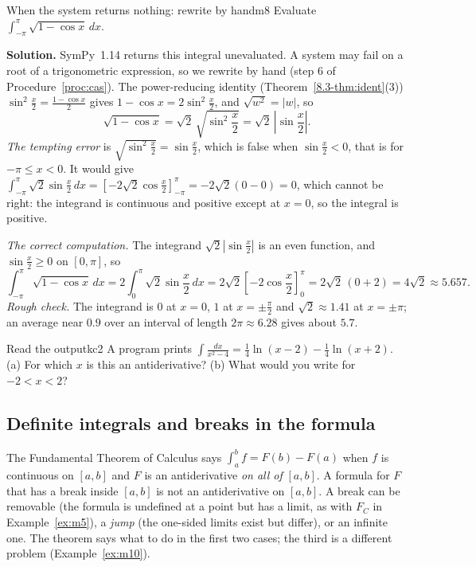 \documentclass[11pt]{article}
\begin{document}
\begin{exmp}{When the system returns nothing: rewrite by hand}{m8}
Evaluate $\displaystyle\int_{-\pi}^{\pi}\sqrt{1-\cos x}\,dx$.

\textbf{Solution.} SymPy~1.14 returns this integral unevaluated. A system may fail on a root of a trigonometric expression, so we rewrite by hand (step 6 of Procedure~\ref{proc:cas}). The power-reducing identity (Theorem~\ref{8.3-thm:ident}(3)) $\sin^2\frac x2=\frac{1-\cos x}2$ gives $1-\cos x=2\sin^2\frac x2$, and $\sqrt{w^2}=\lvert w\rvert$, so
\[\sqrt{1-\cos x}=\sqrt2\,\sqrt{\sin^2\frac x2}=\sqrt2\,\left\lvert\sin\frac x2\right\rvert .\]
\emph{The tempting error} is $\sqrt{\sin^2\frac x2}=\sin\frac x2$, which is false when $\sin\frac x2<0$, that is for $-\pi\le x<0$. It would give $\int_{-\pi}^{\pi}\sqrt2\sin\frac x2\,dx=\left[-2\sqrt2\cos\frac x2\right]_{-\pi}^{\pi}=-2\sqrt2(0-0)=0$, which cannot be right: the integrand is continuous and positive except at $x=0$, so the integral is positive.

\emph{The correct computation.} The integrand $\sqrt2\left\lvert\sin\frac x2\right\rvert$ is an even function, and $\sin\frac x2\ge0$ on $[0,\pi]$, so
\[\int_{-\pi}^{\pi}\sqrt{1-\cos x}\,dx=2\int_0^\pi\sqrt2\sin\frac x2\,dx=2\sqrt2\left[-2\cos\frac x2\right]_0^\pi=2\sqrt2\,(0+2)=4\sqrt2\approx5.657 .\]
\emph{Rough check.} The integrand is $0$ at $x=0$, $1$ at $x=\pm\frac\pi2$ and $\sqrt2\approx1.41$ at $x=\pm\pi$; an average near $0.9$ over an interval of length $2\pi\approx6.28$ gives about $5.7$.
\end{exmp}

\begin{kc}{Read the output}{kc2}
A program prints $\displaystyle\int\frac{dx}{x^2-4}=\frac14\ln(x-2)-\frac14\ln(x+2)$. (a) For which $x$ is this an antiderivative? (b) What would you write for $-2<x<2$?
\end{kc}

\subsection*{Definite integrals and breaks in the formula}

The Fundamental Theorem of Calculus says $\int_a^bf=F(b)-F(a)$ when $f$ is continuous on $[a,b]$ and $F$ is an antiderivative \emph{on all of} $[a,b]$. A formula for $F$ that has a break inside $[a,b]$ is not an antiderivative on $[a,b]$. A break can be removable (the formula is undefined at a point but has a limit, as with $F_C$ in Example~\ref{ex:m5}), a \emph{jump} (the one-sided limits exist but differ), or an infinite one. The theorem says what to do in the first two cases; the third is a different problem (Example~\ref{ex:m10}).
\end{document}
